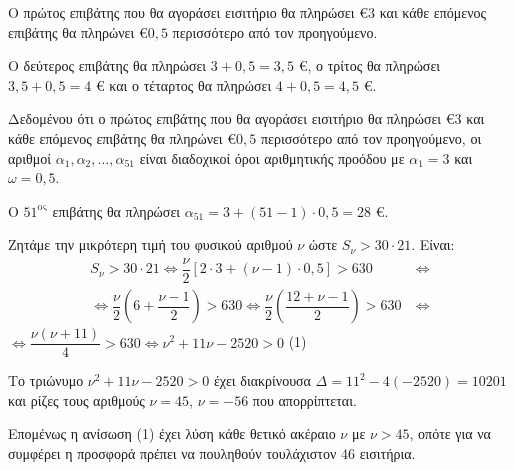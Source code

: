 
\begin{alist}
\item Ο πρώτος επιβάτης που θα αγοράσει εισιτήριο θα πληρώσει \euro{$3$} και κάθε επόμενος επιβάτης θα πληρώνει \euro{$0,5$} περισσότερο από τον προηγούμενο.

Ο δεύτερος επιβάτης θα πληρώσει $3 + 0,5 = 3,5$ \euro{}, ο τρίτος θα πληρώσει $3,5 + 0,5 = 4$ \euro{} και ο τέταρτος θα πληρώσει $4 + 0,5 = 4,5$ \euro{}.

\item Δεδομένου ότι ο πρώτος επιβάτης που θα αγοράσει εισιτήριο θα πληρώσει \euro{$3$} και κάθε επόμενος επιβάτης θα πληρώνει \euro{$0,5$} περισσότερο από τον προηγούμενο, οι αριθμοί $\alpha_1, \alpha_2, \dots, \alpha_{51}$ είναι διαδοχικοί όροι αριθμητικής προόδου με $\alpha_1 = 3$ και $\omega = 0,5$.

\item Ο $51^{\text{ος}}$ επιβάτης θα πληρώσει $\alpha_{51} = 3 + (51 - 1) \cdot 0,5 = 28$ \euro{}.

\item Ζητάμε την μικρότερη τιμή του φυσικού αριθμού $\nu$ ώστε $S_\nu > 30 \cdot 21$. Είναι:
\begin{align*}
S_\nu > 30 \cdot 21 \Leftrightarrow \dfrac{\nu}{2}[2 \cdot 3 + (\nu - 1) \cdot 0,5] > 630 \ &\Leftrightarrow \\
\Leftrightarrow \dfrac{\nu}{2}\left(6 + \dfrac{\nu - 1}{2}\right) > 630 \Leftrightarrow \dfrac{\nu}{2}\left(\dfrac{12 + \nu - 1}{2}\right) > 630 \ &\Leftrightarrow
\end{align*}
$\Leftrightarrow \dfrac{\nu(\nu + 11)}{4} > 630 \Leftrightarrow \nu^2 + 11\nu - 2520 > 0$ (1)

Το τριώνυμο $\nu^2 + 11\nu - 2520 > 0$ έχει διακρίνουσα
$\Delta = 11^2 - 4(-2520) = 10201$
και ρίζες τους αριθμούς $\nu = 45$, $\nu = -56$ που απορρίπτεται.

Επομένως η ανίσωση (1) έχει λύση κάθε θετικό ακέραιο $\nu$ με $\nu > 45$, οπότε για να συμφέρει η προσφορά πρέπει να πουληθούν τουλάχιστον $46$ εισιτήρια.
\end{alist}

